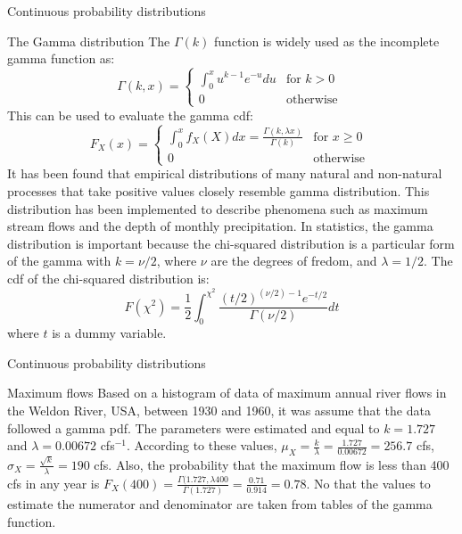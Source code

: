 \documentclass[8pt]{beamer}
\renewcommand{\emph}[1]{\textcolor{myorange}{#1}}
\begin{document}
\begin{frame}{Continuous probability distributions} 
    \begin{block}{The \alert{Gamma} distribution}
        The $\Gamma (k)$ function is widely used as the \emph{incomplete gamma function} as:
\[
\Gamma (k,x) =
\begin{cases}
    \int_0^x u^{k-1} e^{-u} du & \text{for } k > 0 \\
    0 & \text{otherwise }
\end{cases}
\]
This can be used to evaluate the gamma \emph{cdf}:
\[
F_X (x) =
\begin{cases}
    \int_0^x f_X (X) dx = \frac{\Gamma (k, \lambda x)}{\Gamma (k)} & \text{for } x \geq 0 \\
    0 & \text{otherwise }
\end{cases}
\]
It has been found that empirical distributions of many natural and non-natural processes that take positive values closely resemble \emph{gamma distribution}. This distribution has been implemented to describe phenomena such as maximum stream flows and the depth of monthly precipitation. In statistics, the \emph{gamma distribution} is important because the \alert{chi-squared distribution} is a particular form of the gamma with $k=\nu /2$, where $\nu$ are the degrees of fredom, and $\lambda = 1/2$. The \emph{cdf} of the \emph{chi-squared distribution} is:
\[
    F (\chi^2) = \frac{1}{2} \int_0^{\chi^2} \frac{(t/2)^{(\nu/2)-1} e^{-t/2}}{\Gamma (\nu/2)} dt
\]
where $t$ is a dummy variable.
    \end{block}
\end{frame}

\begin{frame}{Continuous probability distributions} 
 \begin{exampleblock}{Maximum flows}
     Based on a histogram of data of maximum annual river flows in the Weldon River, USA, between 1930 and 1960, it was assume that the data followed a \emph{gamma pdf}. The parameters were estimated and equal to $k= 1.727$ and $\lambda = 0.00672$ cfs$^{-1}$. According to these values, $\mu_X = \frac{k}{\lambda} = \frac{1.727}{0.00672} = 256.7$ cfs, $\sigma_X  = \frac{\sqrt{k}}{\lambda} = 190$ cfs. Also, the probability that the maximum flow is less than 400 cfs in any year is $F_X (400) = \frac{\Gamma (1.727, \lambda 400}{\Gamma (1.727)} = \frac{0.71}{0.914} = 0.78$. No that the values to estimate the numerator and denominator are taken from tables of the gamma function. 
    \end{exampleblock}
\end{frame}
\end{document}
